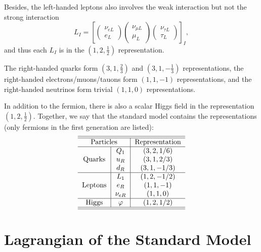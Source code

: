 Besides, the left-handed leptons also involves the weak interaction but not the strong interaction
\begin{equation}
	L_I = \left[
		\begin{pmatrix} \nu_{e L} \\ e_L \end{pmatrix} 
		\begin{pmatrix} \nu_{\mu L} \\ \mu_L \end{pmatrix} 
		\begin{pmatrix} \nu_{\tau L} \\ \tau_L \end{pmatrix}
	\right]_I,
\end{equation}
and thus each $L_I$ is in the $\left(1,2,\frac{1}{2}\right)$ representation.

The right-handed quarks form $\left(3,1,\frac{2}{3}\right)$ and $\left(3,1,-\frac{1}{3}\right)$ representations, the right-handed electrons/muons/tauons form $\left(1,1,-1\right)$ representations, and the right-handed neutrinos form trivial $\left(1,1,0\right)$ representations.

In addition to the fermion, there is also a scalar Higgs field in the representation $\left(1,2,\frac{1}{2}\right)$.
Together, we say that the standard model contains the representations (only fermions in the first generation are listed):
\begin{equation}
\begin{tabular}{c|c|c}
\hline \hline
\multicolumn{2}{c|}{Particles} & Representation\tabularnewline
\hline 
\multirow{3}{*}{Quarks} & $Q_{1}$ & $(3,2,1/6)$\tabularnewline
 & $u_{R}$ & $(3,1,2/3)$\tabularnewline
 & $d_{R}$ & $(3,1,-1/3)$\tabularnewline
\hline 
\multirow{3}{*}{Leptons} & $L_{1}$ & $(1,2,-1/2)$\tabularnewline
 & $e_{R}$ & $(1,1,-1)$\tabularnewline
 & $\nu_{eR}$ & $(1,1,0)$\tabularnewline
\hline 
Higgs & $\varphi$ & $(1,2,1/2)$\tabularnewline
\hline \hline
\end{tabular}
\end{equation}




\section{Lagrangian of the Standard Model}

